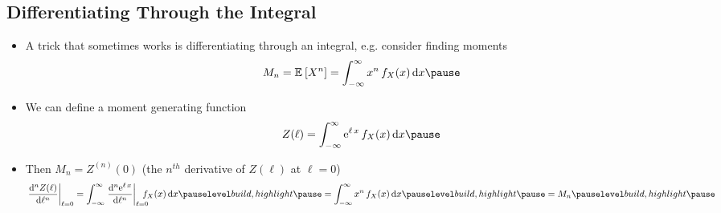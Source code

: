 \begin{slide}
\section[-1]{Differentiating Through the Integral}

\begin{PauseHighLight}
  \begin{itemize}
  \item A trick that sometimes works is differentiating through an
    integral, e.g.{} consider finding moments
    \begin{align*}
      M_n = \av{X^n} = \int_{-\infty}^\infty x^n \, f_X(x) \, \dd x\pause
    \end{align*}
  \item We can define a moment generating function
    \begin{align*}
      Z(\ell) =  \int_{-\infty}^\infty \e{\ell \, x} \, f_X(x) \, \dd x\pause
    \end{align*}
  \item Then $M_n = Z^{(n)}(0)$\pause{} (the $n^{th}$ derivative of $Z(\ell)$
    at $\ell = 0$)\pauseb
    \begin{align*}
      \left. \frac{\dd^n Z(\ell)}{\dd \ell^n} \right|_{\ell = 0} = 
      \int_{-\infty}^\infty \left. \frac{\dd^n \e{\ell \, x}}{\dd
      \ell^n}  \right|_{\ell = 0}  \hspace{-1em} \, f_X(x) \, \dd x\pauseb
      =  \int_{-\infty}^\infty x^n \, f_X(x) \, \dd x\pauseb = M_n\pauseb
    \end{align*}
  \end{itemize}
\end{PauseHighLight}

\end{slide}


